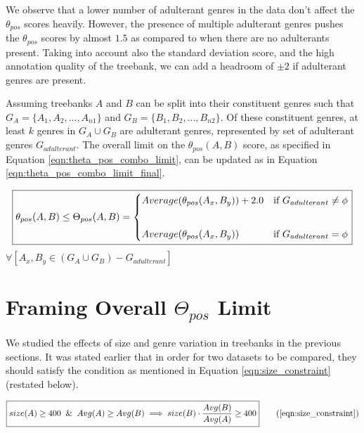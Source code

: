 We observe that a lower number of adulterant genres in the data don't affect the $\theta_{pos}$ scores heavily. However, the presence of multiple adulterant genres pushes the $\theta_{pos}$ scores by almost $1.5$ as compared to when there are no adulterants present. Taking into account also the standard deviation score, and the high annotation quality of the treebank, we can add a headroom of $\pm 2$ if adulterant genres are present. 

Assuming treebanks $A$ and $B$ can be split into their constituent genres such that $G_{A} = \{A_{1}, A_{2}, ... , A_{n1}\}$ and $G_{B} = \{B_{1}, B_{2}, ... , B_{n2}\}$. Of these constituent genres, at least $k$ genres in $G_{A} \cup G_{B}$ are adulterant genres, represented by set of adulterant genres $G_{adulterant}$. The overall limit on the $\theta_{pos}(A, B)$ score, as specified in Equation \ref{eqn:theta_pos_combo_limit}, can be updated as in Equation \ref{eqn:theta_pos_combo_limit_final}.

\begin{equation}
    \boxed{\theta_{pos}(A, B) \leq \Theta_{pos}(A, B) = \begin{cases}
    Average(\theta_{pos}(A_{x}, B_{y})) + 2.0 & \text{if } G_{adulterant} \neq \phi\\
    \vspace{2mm}\\
    Average(\theta_{pos}(A_{x}, B_{y})) & \text{if } G_{adulterant} = \phi\\
    \end{cases}}
\label{eqn:theta_pos_combo_limit_final}
\end{equation}
\hfill $\forall [A_{x}, B_{y} \in (G_{A} \cup G_{B}) - G_{adulterant}]$

\section{Framing Overall \texorpdfstring{$\Theta_{pos}$}{Theta\_pos} Limit}
\label{sec:pos-harmony-calculations}

We studied the effects of size and genre variation in treebanks in the previous sections. It was stated earlier that in order for two datasets to be compared, they should satisfy the condition as mentioned in Equation \ref{eqn:size_constraint} (restated below).

\begin{equation}
\boxed{size(A) \geq 400 \And Avg(A) \geq Avg(B) \implies size(B) \cdot \frac{Avg(B)}{Avg(A)} \geq 400} \tag{\ref{eqn:size_constraint}}
\end{equation}

